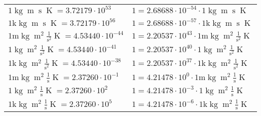\begin{center}
\begin{longtable}{l l}
{\color{black}$1 \bm{\mathrm{ }}\operatorname{kg}{\operatorname{m}}{\operatorname{s}}{}{\operatorname{K}} = 3.72179\cdot10^{53} $}   & {\color{black}$ 1 = 2.68688\cdot10^{-54} \cdot 1 \bm{\mathrm{ }}\operatorname{kg}{\operatorname{m}}{\operatorname{s}}{}{\operatorname{K}}$}  \\
{\color{gray}$1 \bm{\mathrm{ k}}\operatorname{kg}{\operatorname{m}}{\operatorname{s}}{}{\operatorname{K}} = 3.72179\cdot10^{56} $}   & {\color{gray}$ 1 = 2.68688\cdot10^{-57} \cdot 1 \bm{\mathrm{ k}}\operatorname{kg}{\operatorname{m}}{\operatorname{s}}{}{\operatorname{K}}$}  \\
{\color{gray}$1 \bm{\mathrm{ m}}\operatorname{kg}{\operatorname{m}^2}\frac1{\operatorname{s}^2}{}{\operatorname{K}} = 4.53440\cdot10^{-44} $}   & {\color{gray}$ 1 = 2.20537\cdot10^{43} \cdot 1 \bm{\mathrm{ m}}\operatorname{kg}{\operatorname{m}^2}\frac1{\operatorname{s}^2}{}{\operatorname{K}}$}  \\
{\color{black}$1 \bm{\mathrm{ }}\operatorname{kg}{\operatorname{m}^2}\frac1{\operatorname{s}^2}{}{\operatorname{K}} = 4.53440\cdot10^{-41} $}   & {\color{black}$ 1 = 2.20537\cdot10^{40} \cdot 1 \bm{\mathrm{ }}\operatorname{kg}{\operatorname{m}^2}\frac1{\operatorname{s}^2}{}{\operatorname{K}}$}  \\
{\color{gray}$1 \bm{\mathrm{ k}}\operatorname{kg}{\operatorname{m}^2}\frac1{\operatorname{s}^2}{}{\operatorname{K}} = 4.53440\cdot10^{-38} $}   & {\color{gray}$ 1 = 2.20537\cdot10^{37} \cdot 1 \bm{\mathrm{ k}}\operatorname{kg}{\operatorname{m}^2}\frac1{\operatorname{s}^2}{}{\operatorname{K}}$}  \\
{\color{gray}$1 \bm{\mathrm{ m}}\operatorname{kg}{\operatorname{m}^2}\frac1{\operatorname{s}}{}{\operatorname{K}} = 2.37260\cdot10^{-1} $}   & {\color{gray}$ 1 = 4.21478\cdot10^{0} \cdot 1 \bm{\mathrm{ m}}\operatorname{kg}{\operatorname{m}^2}\frac1{\operatorname{s}}{}{\operatorname{K}}$}  \\
{\color{black}$1 \bm{\mathrm{ }}\operatorname{kg}{\operatorname{m}^2}\frac1{\operatorname{s}}{}{\operatorname{K}} = 2.37260\cdot10^{2} $}   & {\color{black}$ 1 = 4.21478\cdot10^{-3} \cdot 1 \bm{\mathrm{ }}\operatorname{kg}{\operatorname{m}^2}\frac1{\operatorname{s}}{}{\operatorname{K}}$}  \\
{\color{gray}$1 \bm{\mathrm{ k}}\operatorname{kg}{\operatorname{m}^2}\frac1{\operatorname{s}}{}{\operatorname{K}} = 2.37260\cdot10^{5} $}   & {\color{gray}$ 1 = 4.21478\cdot10^{-6} \cdot 1 \bm{\mathrm{ k}}\operatorname{kg}{\operatorname{m}^2}\frac1{\operatorname{s}}{}{\operatorname{K}}$}  \\

\end{longtable}
\end{center}
